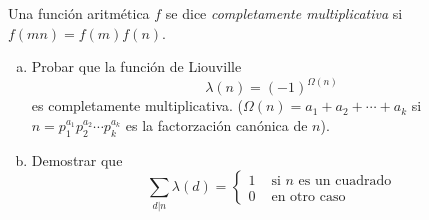 \documentclass[twoside]{article}
\begin{document}
\begin{ejercicio}{6}
Una función aritmética $f$ se dice \textit{completamente multiplicativa} si $f(mn)=f(m)f(n)$.
\begin{enumerate}[(a)]
\item Probar que la función de Liouville
	\[ λ(n) = (-1)^{Ω(n)} \]
	es completamente multiplicativa. ($Ω(n) = a_1+a_2+\cdots+a_k$ si $n=p_1^{a_1}p_2^{a_2}\cdots p_k^{a_k}$ es la factorzación canónica de $n$).
\item Demostrar que
	\[ \sum_{d|n} λ(d) = \begin{cases}
		1 &\text{ si }n\text{ es un cuadrado}\\
		0 &\text{ en otro caso}
	\end{cases}\]
\end{enumerate}
\end{ejercicio}
\end{document}
